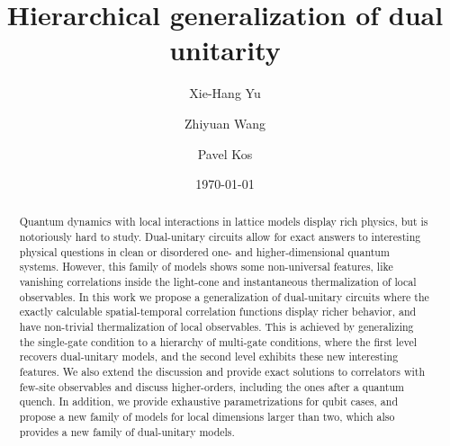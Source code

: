 \documentclass[aps,prx,twocolumn,notitlepage,nofootinbib,nobalancelastpage]{revtex4-2}
\theoremstyle{break}
\newcommand{\1}{\mathbbm{1}}
\theoremstyle{plain}
\theoremstyle{plain}
\theoremstyle{plain}
\begin{document}
\title{Hierarchical generalization of dual unitarity} 


\author{Xie-Hang Yu}
\author{Zhiyuan Wang}
\author{Pavel Kos}%

%


\date{\today}

\begin{abstract}
Quantum dynamics with local interactions in lattice models display rich physics, but is notoriously hard to study. Dual-unitary circuits allow for exact answers to interesting physical questions in clean or disordered one- and higher-dimensional quantum systems. 
However, this family of models shows some non-universal features, like vanishing correlations inside the light-cone and instantaneous thermalization of local observables.
In this work we propose a generalization of dual-unitary circuits where the exactly calculable spatial-temporal correlation functions display richer behavior, and have non-trivial thermalization of local observables. This is achieved by generalizing the 
single-gate condition to a hierarchy of multi-gate conditions, where the first level recovers dual-unitary models, and the second level exhibits these new interesting features. 
We also extend the discussion and provide exact solutions to correlators with few-site observables and discuss higher-orders, including the ones after a quantum quench. In addition, we provide exhaustive parametrizations for qubit cases, and propose a new family of models for local dimensions larger than two, which also provides a new family of dual-unitary models.
%
%
\end{abstract}
\maketitle
\end{document}
